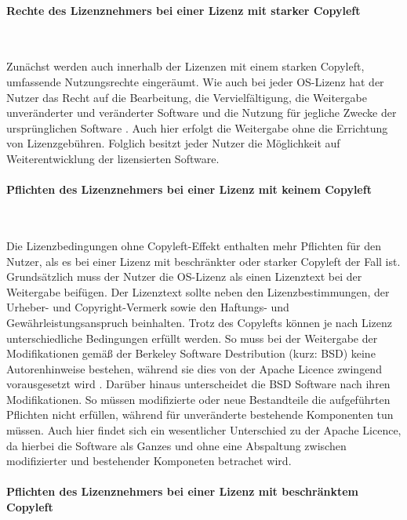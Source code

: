 \paragraph{Rechte des Lizenznehmers bei einer Lizenz mit starker Copyleft}$~$

Zunächst werden auch innerhalb der Lizenzen mit einem starken Copyleft, umfassende Nutzungsrechte eingeräumt. Wie auch bei jeder OS-Lizenz hat der Nutzer das Recht auf die Bearbeitung, die Vervielfältigung, die Weitergabe unveränderter und veränderter Software und die Nutzung für jegliche Zwecke der ursprünglichen Software \cite[S. 9]{bitkom_open_nodate}. Auch hier erfolgt die Weitergabe ohne die Errichtung von Lizenzgebühren. Folglich besitzt jeder Nutzer die Möglichkeit auf Weiterentwicklung der lizensierten Software.

\paragraph{Pflichten des Lizenznehmers bei einer Lizenz mit keinem Copyleft}$~$

Die Lizenzbedingungen ohne Copyleft-Effekt enthalten mehr Pflichten für den Nutzer, als es bei einer Lizenz mit beschränkter oder starker Copyleft der Fall ist. Grundsätzlich muss der Nutzer die OS-Lizenz als einen Lizenztext bei der Weitergabe beifügen. Der Lizenztext sollte neben den Lizenzbestimmungen, der Urheber- und Copyright-Vermerk sowie den Haftungs- und Gewährleistungsanspruch beinhalten. Trotz des Copylefts können je nach Lizenz unterschiedliche Bedingungen erfüllt werden. So muss bei der Weitergabe der Modifikationen gemäß der Berkeley Software Destribution (kurz: BSD) keine Autorenhinweise bestehen, während sie dies von der Apache Licence zwingend vorausgesetzt wird \cite[S. 60]{schaaf_open-source-lizenzen_2013}. Darüber hinaus unterscheidet die BSD Software nach ihren Modifikationen. So müssen modifizierte oder neue Bestandteile die aufgeführten Pflichten nicht erfüllen, während für unveränderte bestehende Komponenten tun müssen. Auch hier findet sich ein wesentlicher Unterschied zu der Apache Licence, da hierbei die Software als Ganzes und ohne eine Abspaltung zwischen modifizierter und bestehender Komponeten betrachet wird. 

\paragraph{Pflichten des Lizenznehmers bei einer Lizenz mit beschränktem Copyleft}$~$

